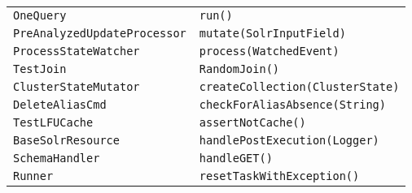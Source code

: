 \begin{center}
\begin{longtable}{ll}
 \lstinline/OneQuery/&{\lstinline/run()/}\\
 \lstinline/PreAnalyzedUpdateProcessor/&{\lstinline/mutate(SolrInputField)/}\\
 \lstinline/ProcessStateWatcher/&{\lstinline/process(WatchedEvent)/}\\
 \lstinline/TestJoin/&{\lstinline/RandomJoin()/}\\
 \lstinline/ClusterStateMutator/&{\lstinline/createCollection(ClusterState)/}\\
 \lstinline/DeleteAliasCmd/&{\lstinline/checkForAliasAbsence(String)/}\\
 \lstinline/TestLFUCache/&{\lstinline/assertNotCache()/}\\
 \lstinline/BaseSolrResource/&{\lstinline/handlePostExecution(Logger)/}\\
 \lstinline/SchemaHandler/&{\lstinline/handleGET()/}\\
 \lstinline/Runner/&{\lstinline/resetTaskWithException()/}\\




\end{longtable}
\end{center}

